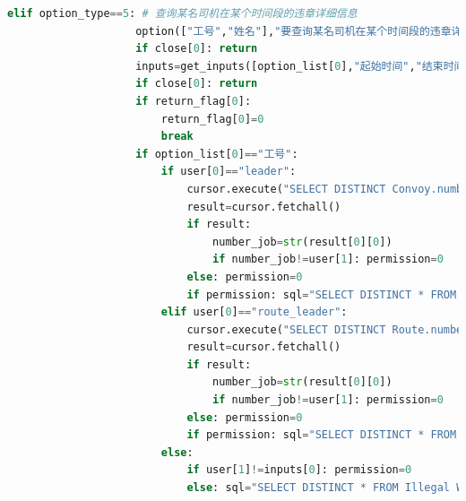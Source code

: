 \documentclass {article}
\begin{document}
\begin{lstlisting}[language=python]
                elif option_type==5: # 查询某名司机在某个时间段的违章详细信息
                    option(["工号","姓名"],"要查询某名司机在某个时间段的违章详细信息，请先选择通过司机的工号还是姓名查询：")
                    if close[0]: return 
                    inputs=get_inputs([option_list[0],"起始时间","结束时间"], "请输入要查询的司机的"+option_list[0]+"、时间段的起始时间和结束时间（YYYY-mm-dd HH:ii:ss格式）",inputs[:3])  
                    if close[0]: return
                    if return_flag[0]:
                        return_flag[0]=0
                        break
                    if option_list[0]=="工号": 
                        if user[0]=="leader": 
                            cursor.execute("SELECT DISTINCT Convoy.number_job_leader FROM Convoy, Bus, Driver WHERE Convoy.number_convoy=Bus.number_convoy and Bus.number_route=Driver.number_route and Driver.number_job="+inputs[0]+";")
                            result=cursor.fetchall()
                            if result: 
                                number_job=str(result[0][0])
                                if number_job!=user[1]: permission=0
                            else: permission=0
                            if permission: sql="SELECT DISTINCT * FROM Illegal WHERE number_convoy="+str(number_convoy)+" and number_job="+inputs[0]
                        elif user[0]=="route_leader": 
                            cursor.execute("SELECT DISTINCT Route.number_job_routeleader FROM Route, Driver WHERE Route.number_route=Driver.number_route and Driver.number_job="+inputs[0]+";")
                            result=cursor.fetchall()
                            if result:
                                number_job=str(result[0][0])
                                if number_job!=user[1]: permission=0  
                            else: permission=0                          
                            if permission: sql="SELECT DISTINCT * FROM Illegal WHERE number_route="+str(number_route)+" and number_job="+inputs[0]
                        else:
                            if user[1]!=inputs[0]: permission=0
                            else: sql="SELECT DISTINCT * FROM Illegal WHERE number_job="+inputs[0]
                            

\end{lstlisting}
\end{document}
